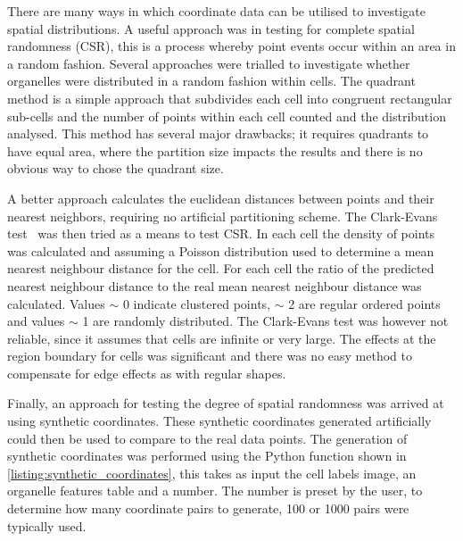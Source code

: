 There are many ways in which coordinate data can be utilised to investigate spatial distributions. A useful approach was in testing for complete spatial randomness (CSR), this is a process whereby point events occur within an area in a random fashion. Several approaches were trialled to investigate whether organelles were distributed in a random fashion within cells. The quadrant method is a simple approach that subdivides each cell into congruent rectangular sub-cells and the number of points within each cell counted and the distribution analysed. This method has several major drawbacks; it requires quadrants to have equal area, where the partition size impacts the results and there is no obvious way to chose the quadrant size.

A better approach calculates the euclidean distances between points and their nearest neighbors, requiring no artificial partitioning scheme. The Clark-Evans test~\cite{Clark1954} was then tried as a means to test CSR. In each cell the density of points was calculated and assuming a Poisson distribution used to determine a mean nearest neighbour distance for the cell. For each cell the ratio of the predicted nearest neighbour distance to the real mean nearest neighbour distance was calculated. Values $\sim$ 0 indicate clustered points, $\sim$ 2 are regular ordered points and values $\sim$ 1 are randomly distributed. The Clark-Evans test was however not reliable, since it assumes that cells are infinite or very large. The effects at the region boundary for cells was significant and there was no easy method to compensate for edge effects as with regular shapes.

Finally, an approach for testing the degree of spatial randomness was arrived at using synthetic coordinates. These synthetic coordinates generated artificially could then be used to compare to the real data points. The generation of synthetic coordinates was performed using the Python function shown in \autoref{listing:synthetic_coordinates}, this takes as input the cell labels image, an organelle features table and a number. The number is preset by the user, to determine how many coordinate pairs to generate, 100 or 1000 pairs were typically used.

